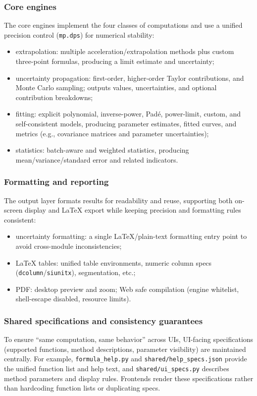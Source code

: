 \documentclass[a4paper,11pt]{article}
\begin{document}
\subsubsection{Core engines}
The core engines implement the four classes of computations and use a unified precision control (\texttt{mp.dps}) for numerical stability:
\begin{itemize}
  \item extrapolation: multiple acceleration/extrapolation methods plus custom three-point formulas, producing a limit estimate and uncertainty;
  \item uncertainty propagation: first-order, higher-order Taylor contributions, and Monte Carlo sampling; outputs values, uncertainties, and optional contribution breakdowns;
  \item fitting: explicit polynomial, inverse-power, Padé, power-limit, custom, and self-consistent models, producing parameter estimates, fitted curves, and metrics (e.g., covariance matrices and parameter uncertainties);
  \item statistics: batch-aware and weighted statistics, producing mean/variance/standard error and related indicators.
\end{itemize}

\subsubsection{Formatting and reporting}
The output layer formats results for readability and reuse, supporting both on-screen display and LaTeX export while keeping precision and formatting rules consistent:
\begin{itemize}
  \item uncertainty formatting: a single LaTeX/plain-text formatting entry point to avoid cross-module inconsistencies;
  \item LaTeX tables: unified table environments, numeric column specs (\texttt{dcolumn}/\texttt{siunitx}), segmentation, etc.;
  \item PDF: desktop preview and zoom; Web safe compilation (engine whitelist, shell-escape disabled, resource limits).
\end{itemize}

\subsubsection{Shared specifications and consistency guarantees}
To ensure ``same computation, same behavior'' across UIs, UI-facing specifications (supported functions, method descriptions, parameter visibility) are maintained centrally. For example, \texttt{formula\_help.py} and \texttt{shared/help\_specs.json} provide the unified function list and help text, and \texttt{shared/ui\_specs.py} describes method parameters and display rules. Frontends render these specifications rather than hardcoding function lists or duplicating specs.
\end{document}
